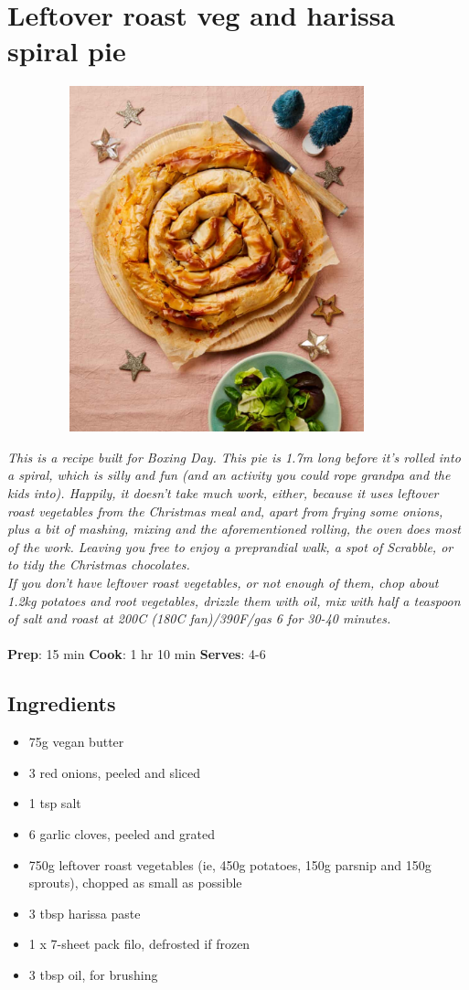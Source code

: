 \documentclass{book}
\begin{document}
\section{Leftover roast veg and harissa spiral pie}
\begin{figure}
\centering\includegraphics[width=10cm,height=10cm,keepaspectratio]{Recipe_Pictures/Leftover_roast_veg_and_harissa_spiral_pie.png}
\end{figure}
\emph{This is a recipe built for Boxing Day. This pie is 1.7m long before it’s rolled into a spiral, which is silly and fun (and an activity you could rope grandpa and the kids into). Happily, it doesn’t take much work, either, because it uses leftover roast vegetables from the Christmas meal and, apart from frying some onions, plus a bit of mashing, mixing and the aforementioned rolling, the oven does most of the work. Leaving you free to enjoy a preprandial walk, a spot of Scrabble, or to tidy the Christmas chocolates.\\ 
If you don’t have leftover roast vegetables, or not enough of them, chop about 1.2kg potatoes and root vegetables, drizzle them with oil, mix with half a teaspoon of salt and roast at 200C (180C fan)/390F/gas 6 for 30-40 minutes.}\\\\ 
\textbf{Prep}: 15 min
\textbf{Cook}: 1 hr 10 min
\textbf{Serves}: 4-6
\subsection*{Ingredients}
\begin{itemize}
\item 75g vegan butter
\item 3 red onions, peeled and sliced
\item 1 tsp salt
\item 6 garlic cloves, peeled and grated
\item 750g leftover roast vegetables (ie, 450g potatoes, 150g parsnip and 150g sprouts), chopped as small as possible
\item 3 tbsp harissa paste
\item 1 x 7-sheet pack filo, defrosted if frozen
\item 3 tbsp oil, for brushing
\end{itemize}
\end{document}
